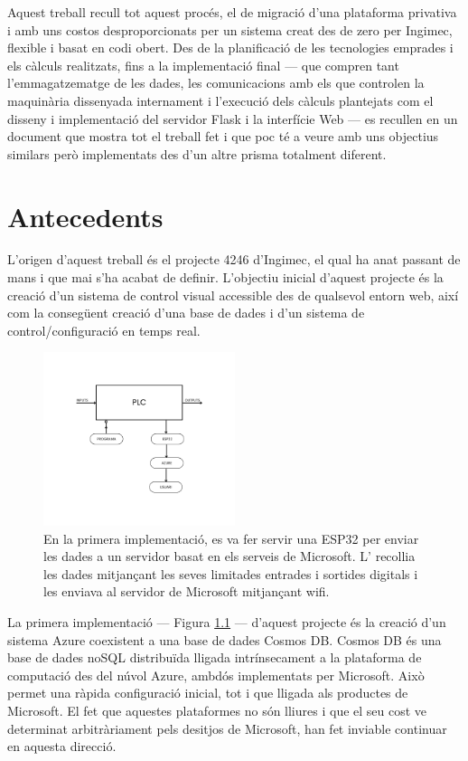 \documentclass{tfgitic}[2022/06/30]
\begin{document}
Aquest treball recull tot aquest procés, el de migració d'una plataforma privativa i amb
uns costos desproporcionats per un sistema creat des de zero per Ingimec, flexible i basat en
codi obert. Des de la planificació de les tecnologies emprades i els càlculs realitzats, fins a la
implementació final — que compren tant l'emmagatzematge de les dades, les comunicacions
amb els  que controlen la maquinària dissenyada internament i l'execució dels càlculs plantejats com el disseny i implementació del servidor Flask i la interfície Web — es recullen en un
document que mostra tot el treball fet i que poc té a veure amb uns objectius similars
però implementats des d'un altre prisma totalment diferent.

\chapter{Antecedents}
L'origen d'aquest treball és el projecte 4246 d'Ingimec, el qual ha anat passant de mans i que mai s'ha acabat de definir. L'objectiu inicial d'aquest projecte és la creació d'un sistema de control visual accessible des de qualsevol entorn web, així com la consegüent creació d'una base de dades i d'un sistema de control/configuració en temps real.

\begin{figure}[h]
\centering
\includegraphics[width=0.5\textwidth]{img/diagramAzure.png}
\caption{En la primera implementació, es va fer servir una ESP32 per enviar les dades a un servidor basat en els serveis de Microsoft. L' recollia les dades mitjançant les seves limitades entrades i sortides digitals i les enviava al servidor de Microsoft mitjançant wifi.} 
\label{diagramAzure}
\end{figure}

La primera implementació — Figura \ref{diagramAzure} — d'aquest projecte és la creació d'un sistema
Azure coexistent a una base de dades Cosmos DB. Cosmos DB és una base de dades noSQL
distribuïda lligada intrínsecament a la plataforma de computació des del núvol Azure, ambdós
implementats per Microsoft. Això permet una ràpida configuració inicial, tot i que lligada als
productes de Microsoft. El fet que aquestes plataformes no són lliures i que el seu cost ve
determinat arbitràriament pels desitjos de Microsoft, han fet inviable continuar en aquesta
direcció.
\end{document}
